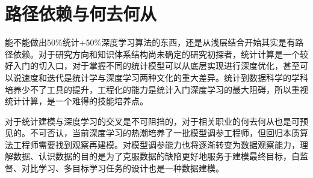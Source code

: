 \documentclass{ctexart}
\begin{document}
\section{路径依赖与何去何从}

能不能做出50\%统计+50\%深度学习算法的东西，还是从浅层结合开始其实是有路径依赖。对于研究方向和知识体系结构尚未确定的研究初探者，统计计算是一个较好入门的切入口，对于掌握不同的统计模型可以从底层实现进行深度优化，甚至可以说速度和迭代是统计学与深度学习两种文化的重大差异。统计到数据科学的学科培养少不了工具的提升，工程化的能力是统计入门深度学习的最大阻碍，所以重视统计计算，是一个难得的技能培养点。

对于统计建模与深度学习的交叉是不可阻挡的，对于相关职业的何去何从也是可预见的。不可否认，当前深度学习的热潮培养了一批模型调参工程师，但回归本质算法工程师需要找到观察再建模。对模型调参能力也将逐渐转变为数据观察能力，理解数据、认识数据的目的是为了克服数据的缺陷更好地服务于建模最终目标，自监督、对比学习、多目标学习任务的设计也是一种数据建模。





\end{document}
